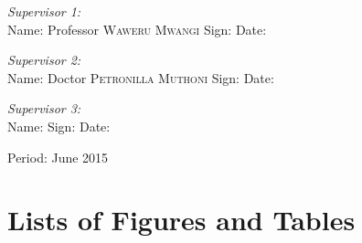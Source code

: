 \documentclass[12pt,svgnames,smaller]{article} %
\begin{document}
\begin{titlepage}
		\begin{minipage}{1.0\textwidth}
			\begin{flushleft} \large
				\emph{Supervisor 1:} \\
				Name: Professor \textsc{Waweru Mwangi} Sign: \hrulefill Date: \hrulefill
			\end{flushleft}
		\end{minipage}
		
		\begin{minipage}{1.0\textwidth}
			\begin{flushleft} \large
				\emph{Supervisor 2:} \\
				Name: Doctor \textsc{Petronilla Muthoni} Sign: \hrulefill Date: \hrulefill
			\end{flushleft}
		\end{minipage}
		
		\begin{minipage}{1.0\textwidth}
			\begin{flushleft} \large
				\emph{Supervisor 3:} \\
				Name: \hrulefill Sign: \hrulefill Date: \hrulefill
			\end{flushleft}
		\end{minipage}
		
		\vfill
		
		
		\begin{center}
			{\large Period: June 2015}
		\end{center}
	\end{titlepage}
	
	
	\clearpage
	\tableofcontents
	\clearpage

	
	\section*{\textbf{ Lists of Figures and Tables}}
	
	
\end{document}
